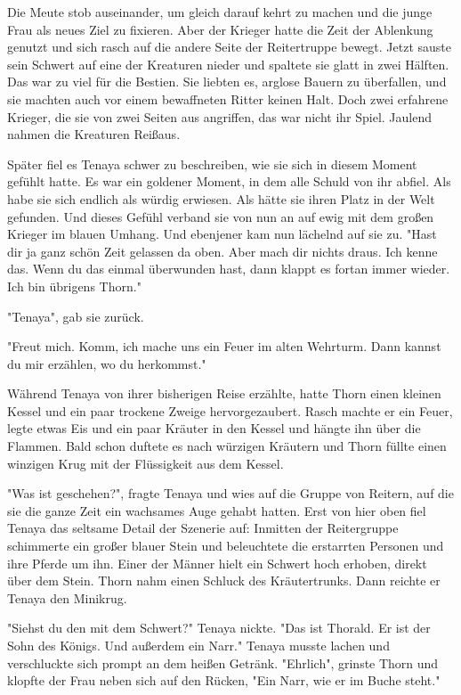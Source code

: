 \documentclass[10pt, a4paper, oneside]{book}
\begin{document}
\begin{multicols}{2}
Die Meute stob auseinander, um gleich darauf kehrt zu machen und die junge Frau als neues Ziel zu fixieren. Aber der Krieger hatte die Zeit der Ablenkung genutzt und sich rasch auf die andere Seite der Reitertruppe bewegt. Jetzt sauste sein Schwert auf eine der Kreaturen nieder und spaltete sie glatt in zwei Hälften. Das war zu viel für die Bestien. Sie liebten es, arglose Bauern zu überfallen, und sie machten auch vor einem bewaffneten Ritter keinen Halt. Doch zwei erfahrene Krieger, die sie von zwei Seiten aus angriffen, das war nicht ihr Spiel. Jaulend nahmen die Kreaturen Reißaus.

Später fiel es Tenaya schwer zu beschreiben, wie sie sich in diesem Moment gefühlt hatte. Es war ein goldener Moment, in dem alle Schuld von ihr abfiel. Als habe sie sich endlich als würdig erwiesen. Als hätte sie ihren Platz in der Welt gefunden. Und dieses Gefühl verband sie von nun an auf ewig mit dem großen Krieger im blauen Umhang. Und ebenjener kam nun lächelnd auf sie zu.  "Hast dir ja ganz schön Zeit gelassen da oben. Aber mach dir nichts draus. Ich kenne das. Wenn du das einmal überwunden hast, dann klappt es fortan immer wieder. Ich bin übrigens Thorn." 

"Tenaya", gab sie zurück. 

"Freut mich. Komm, ich mache uns ein Feuer im alten Wehrturm. Dann kannst du mir erzählen, wo du herkommst."

Während Tenaya von ihrer bisherigen Reise erzählte, hatte Thorn einen kleinen Kessel und ein paar trockene Zweige hervorgezaubert. Rasch machte er ein Feuer, legte etwas Eis und ein paar Kräuter in den Kessel und hängte ihn über die Flammen. Bald schon duftete es nach würzigen Kräutern und Thorn füllte einen winzigen Krug mit der Flüssigkeit aus dem Kessel.

"Was ist geschehen?", fragte Tenaya und wies auf die Gruppe von Reitern, auf die sie die ganze Zeit ein wachsames Auge gehabt hatten. Erst von hier oben fiel Tenaya das seltsame Detail der Szenerie auf: Inmitten der Reitergruppe schimmerte ein großer blauer Stein und beleuchtete die erstarrten Personen und ihre Pferde um ihn. Einer der Männer hielt ein Schwert hoch erhoben, direkt über dem Stein. Thorn nahm einen Schluck des Kräutertrunks. Dann reichte er Tenaya den Minikrug.

"Siehst du den mit dem Schwert?" Tenaya nickte. "Das ist Thorald. Er ist der Sohn des Königs. Und außerdem ein Narr." Tenaya musste lachen und verschluckte sich prompt an dem heißen Getränk. "Ehrlich", grinste Thorn und klopfte der Frau neben sich auf den Rücken, "Ein Narr, wie er im Buche steht." 


\end{multicols}
\end{document}
